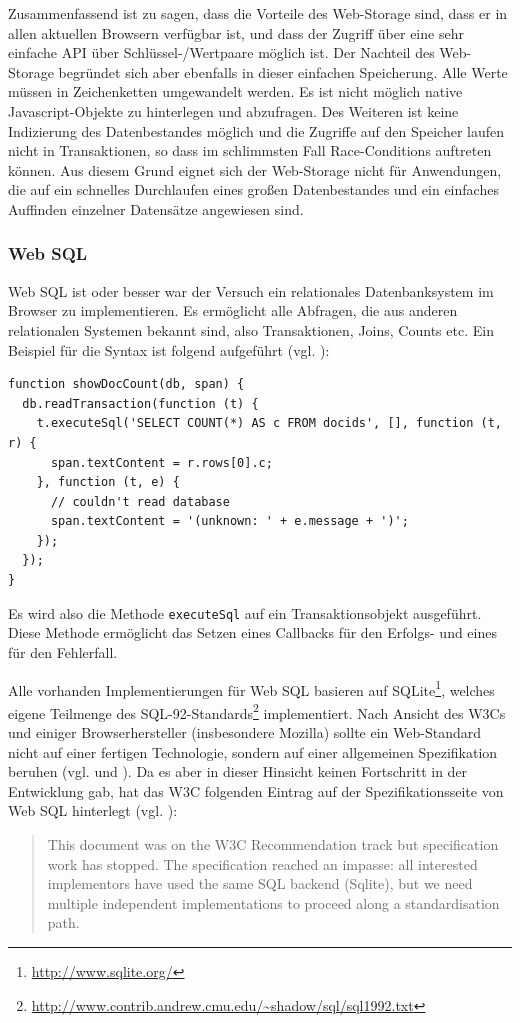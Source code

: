 Zusammenfassend ist zu sagen, dass die Vorteile des Web-Storage sind, dass er in allen aktuellen Browsern verfügbar ist, und dass der Zugriff über eine sehr einfache API über Schlüssel-/Wertpaare möglich ist. Der Nachteil des Web-Storage begründet sich aber ebenfalls in dieser einfachen Speicherung. Alle Werte müssen in Zeichenketten umgewandelt werden. Es ist nicht möglich native Javascript-Objekte zu hinterlegen und abzufragen. Des Weiteren ist keine Indizierung des Datenbestandes möglich und die Zugriffe auf den Speicher laufen nicht in Transaktionen, so dass im schlimmsten Fall Race-Conditions auftreten können. Aus diesem Grund eignet sich der Web-Storage nicht für Anwendungen, die auf ein schnelles Durchlaufen eines großen Datenbestandes und ein einfaches Auffinden einzelner Datensätze angewiesen sind.

\subsubsection*{Web SQL}
Web SQL ist oder besser war der Versuch ein relationales Datenbanksystem im Browser zu implementieren. Es ermöglicht alle Abfragen, die aus anderen relationalen Systemen bekannt sind, also Transaktionen, Joins, Counts etc. Ein Beispiel für die Syntax ist folgend aufgeführt (vgl. \cite{W3C2010}):
\begin{lstlisting}
function showDocCount(db, span) {
  db.readTransaction(function (t) {
    t.executeSql('SELECT COUNT(*) AS c FROM docids', [], function (t, r) {
      span.textContent = r.rows[0].c;
    }, function (t, e) {
      // couldn't read database
      span.textContent = '(unknown: ' + e.message + ')';
    });
  });
}
\end{lstlisting}
Es wird also die Methode \texttt{executeSql} auf ein Transaktionsobjekt ausgeführt. Diese Methode ermöglicht das Setzen eines Callbacks für den Erfolgs- und eines für den Fehlerfall. 

Alle vorhanden Implementierungen für Web SQL basieren auf SQLite\footnote{\url{http://www.sqlite.org/}}, welches eigene Teilmenge des SQL-92-Standards\footnote{\url{http://www.contrib.andrew.cmu.edu/~shadow/sql/sql1992.txt}} implementiert. Nach Ansicht des W3Cs und einiger Browserhersteller (insbesondere Mozilla) sollte ein Web-Standard nicht auf einer fertigen Technologie, sondern auf einer allgemeinen Spezifikation beruhen (vgl. \cite{W3C2010} und \cite{Ranganathan2010}). Da es aber in dieser Hinsicht keinen Fortschritt in der Entwicklung gab, hat das W3C folgenden Eintrag auf der Spezifikationsseite von Web SQL hinterlegt (vgl. \cite{W3C2010}):
\begin{quotation}
 This document was on the W3C Recommendation track but specification work has stopped. The specification reached an impasse: all interested implementors have used the same SQL backend (Sqlite), but we need multiple independent implementations to proceed along a standardisation path.
\end{quotation} 

